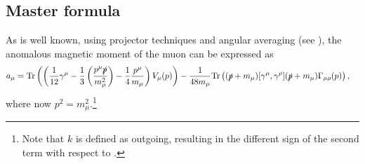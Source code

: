 \documentclass[epj]{webofc}
\newcommand{\<}{\langle}
\renewcommand{\>}{\rangle}
\begin{document}
\subsection{Master formula}\label{MF}

As is well known, using projector techniques and angular averaging
(see \cite{Knecht:2001qf,Jegerlehner:2008zza}), the anomalous magnetic moment of
the muon can be expressed as 
\begin{align}
	\begin{split}
		a_\mu &= \mathrm{Tr}\left( \left(\frac{1}{12} \gamma^\mu - \frac{1}{3} \left( \frac{p^\mu \slashed p}{m_\mu^2} \right) - \frac{1}{4} \frac{p^\mu}{m_\mu} \right) V_\mu(p) \right) - \frac{1}{48 m_\mu} \mathrm{Tr}\left( (\slashed p + m_\mu) [\gamma^\mu,\gamma^\rho] (\slashed p + m_\mu) \Gamma_{\mu\rho}(p) \right) ,
	\end{split}
\end{align}
where now $p^2 = m_\mu^2$.\footnote{Note that $k$ is defined as outgoing,
  resulting in the different sign of the second term with respect to
  \cite{Jegerlehner:2008zza}.} 
\end{document}
